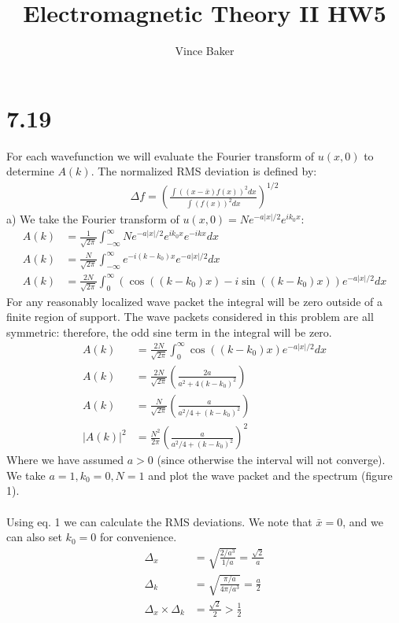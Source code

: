 \documentclass[a4paper,11pt]{article}
\title{Electromagnetic Theory II HW5}
\author{Vince Baker}
\numberwithin{equation}{section}
\newcommand{\lrp}[1]{\left({#1}\right)}
\begin{document}
\maketitle

\section{7.19}
For each wavefunction we will evaluate the Fourier transform of $u(x,0)$ to determine $A(k)$.
The normalized RMS deviation is defined by:
\begin{align}
 \Delta f = \lrp{\frac{\int \lrp{(x-\bar{x})f(x)}^2 dx}{\int (f(x))^2 dx}}^{1/2}
\end{align}
a) We take the Fourier transform of $u(x,0) = Ne^{-a|x|/2}e^{ik_0x}$:
\begin{align}
 A(k) &= \frac{1}{\sqrt{2\pi}}\int_{-\infty}^\infty Ne^{-a|x|/2}e^{ik_0x}e^{-ikx}dx\\
 A(k) &= \frac{N}{\sqrt{2\pi}}\int_{-\infty}^\infty e^{-i(k-k_0)x}e^{-a|x|/2} dx\\
 A(k) &= \frac{2N}{\sqrt{2\pi}}\int_{0}^\infty \lrp{\cos{((k-k_0)x)}-i\sin{((k-k_0)x)}} e^{-a|x|/2} dx
\end{align}
For any reasonably localized wave packet the integral will be zero outside of a finite region of support.
The wave packets considered in this problem are all symmetric: therefore, the odd sine term in the integral will be zero.
\begin{align}
 A(k) &= \frac{2N}{\sqrt{2\pi}}\int_{0}^\infty \cos{((k-k_0)x)} e^{-a|x|/2} dx\\
 A(k) &= \frac{2N}{\sqrt{2\pi}}\lrp{\frac{2a}{a^2+4(k-k_0)^2}}\\
 A(k) &= \frac{N}{\sqrt{2\pi}}\lrp{\frac{a}{a^2/4+(k-k_0)^2}}\\
 |A(k)|^2 &= \frac{N^2}{2\pi}\lrp{\frac{a}{a^2/4+(k-k_0)^2}}^2
\end{align}
Where we have assumed $a>0$ (since otherwise the interval will not converge).
We take $a=1, k_0=0, N=1$ and plot the wave packet and the spectrum (figure 1).
\\ \\
Using eq. 1 we can calculate the RMS deviations.
We note that $\bar{x}=0$, and we can also set $k_0=0$ for convenience.
\begin{align}
 \Delta_x &= \sqrt{\frac{2/a^3}{1/a}} = \frac{\sqrt{2}}{a}\\
 \Delta_k &= \sqrt{\frac{\pi/a}{4\pi/a^3}} = \frac{a}{2}\\
 \Delta_x \times \Delta_k &= \frac{\sqrt{2}}{2} > \frac{1}{2}
\end{align}
\end{document}
